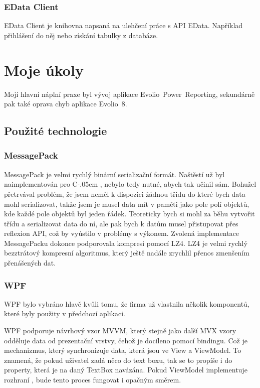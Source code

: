 \documentclass[czech,bachelorpractice,dept460,male,csharp]{diploma}
\newcommand{\EvolioEight}{Evolio~8}
\newcommand{\EFilters}{Evolio~Power~Reporting}
\newcommand{\EData}{EData}
\newcommand{\Csharp}{%
  {\settoheight{\dimen0}{C}C\kern-.05em \resizebox{!}{\dimen0}{\raisebox{\depth}{\#}}}}
\begin{document}
		\subsubsection{EData Client}
		EData Client je knihovna napsaná na ulehčení práce s API {\EData}. Například přihlášení do něj nebo získání tabulky z databáze. 
\section{Moje úkoly}
\label{txt:c3}
	Mojí hlavní náplní praxe byl vývoj aplikace {\EFilters}, sekundárně pak také oprava chyb aplikace {\EvolioEight}.
	\subsection{Použité technologie}
			\subsubsection{MessagePack}
			MessagePack\cite{mpSpec} je velmi rychlý binární serializační formát. Naštěstí už byl naimplementován pro {\Csharp}, nebylo tedy nutné, abych tak učinil sám. Bohužel přetrvával problém, že jsem neměl k dispozici žádnou třidu do které bych data mohl serializovat, takže jsem je musel data mít v paměti jako pole polí objektů, kde každé pole objektů byl jeden řádek. Teoreticky bych si mohl za běhu vytvořit třídu a serializovat data do ní, ale pak bych k datům musel přistupovat přes reflexion API, což by vyústilo v problémy s výkonem. Zvolená implementace MessagePacku\cite{mpImpl} dokonce podporovala kompresi pomocí LZ4. LZ4\cite{l4z} je velmi rychlý bezztrátový kompresní algoritmus, který ještě nadále zrychlil přenos zmenšením přenášených dat. 
		\subsubsection{WPF}
			WPF\cite{wpf} bylo vybráno hlavě kvůli tomu, že firma už vlastnila několik komponentů, které byly použity v předchozí aplikaci.
			
			WPF podporuje návrhový vzor MVVM\cite{mvvm}, který stejně jako další MVX vzory odděluje data od prezentační vrstvy, čehož je docíleno pomocí bindingu. Což je mechanizmus, který synchronizuje data, která jsou ve View a ViewModel. To znamená, že pokud uživatel zadá něco do text boxu, tak se to propíše i do property, která je na daný TextBox navázána. Pokud ViewModel implementuje rozhraní , bude tento proces fungovat i opačným směrem.
			
\end{document}
